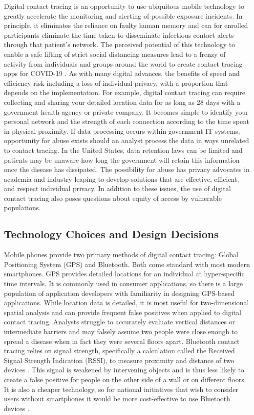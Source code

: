 \documentclass{article}
\begin{document}
Digital contact tracing is an opportunity to use ubiquitous mobile technology to greatly accelerate the monitoring and alerting of possible exposure incidents. In principle, it eliminates the reliance on faulty human memory and can for enrolled participants eliminate the time taken to disseminate infectious contact alerts through that patient’s network. The perceived potential of this technology to enable a safe lifting of strict social distancing measures lead to a frenzy of activity from individuals and groups around the world to create contact tracing apps for COVID-19 \cite{TechRevTracker, CovidTracking}. As with many digital advances, the benefits of speed and efficiency risk including a loss of individual privacy, with a proportion that depends on the implementation\cite{HealthAndLiberties}. For example, digital contact tracing can require collecting and sharing your detailed location data for as long as 28 days with a government health agency or private company. It becomes simple to identify your personal network and the strength of each connection according to the time spent in physical proximity. If data processing occurs within government IT systems, opportunity for abuse exists should an analyst process the data in ways unrelated to contact tracing. In the United States, data retention laws can be limited and patients may be unaware how long the government will retain this information once the disease has dissipated. The possibility for abuse has privacy advocates in academia and industry leaping to develop solutions that are effective, efficient, and respect individual privacy. In addition to these issues, the use of digital contact tracing also poses questions about equity of access by vulnerable populations\cite{AddressingEquity}.

\subsection{Technology Choices and Design Decisions}
Mobile phones provide two primary methods of digital contact tracing: Global Positioning System (GPS) and Bluetooth. Both come standard with most modern smartphones. GPS provides detailed locations for an individual at hyper-specific time intervals. It is commonly used in consumer applications, so there is a large population of application developers with familiarity in designing GPS-based applications. While location data is detailed, it is most useful for two-dimensional spatial analysis and can provide frequent false positives when applied to digital contact tracing. Analysts struggle to accurately evaluate vertical distances or intermediate barriers and may falsely assume two people were close enough to spread a disease when in fact they were several floors apart. Bluetooth contact tracing relies on signal strength, specifically a calculation called the Received Signal Strength Indication (RSSI), to measure proximity and distance of two devices \cite{BluetoothTech}. This signal is weakened by intervening objects and is thus less likely to create a false positive for people on the other side of a wall or on different floors. It is also a cheaper technology, so for national initiatives that wish to consider users without smartphones it would be more cost-effective to use Bluetooth devices \cite{Trackers}. 
\end{document}
